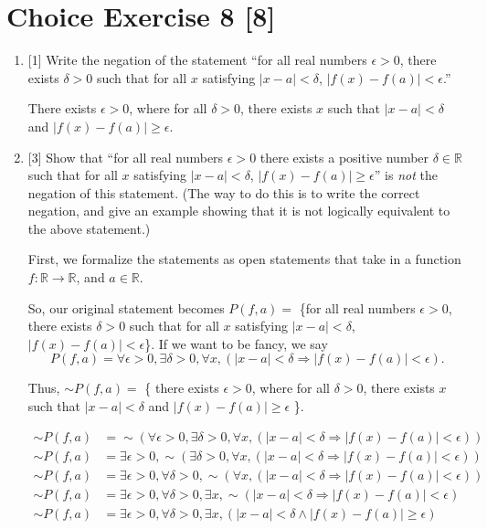 \documentclass{article}
\begin{document}
\section*{Choice Exercise 8 [8]}
\begin{enumerate}
    \item {
        [1] Write the negation of the statement ``for all real numbers \(\epsilon > 0\),
        there exists \(\delta > 0\) such that for all \(x\) satisfying \(|x - a| < \delta\),
        \(|f(x) - f(a)| < \epsilon\).''

        There exists \(\epsilon > 0\), where for all \(\delta > 0\), there exists 
        \(x\) such that \(|x - a| < \delta\) and \(|f(x) - f(a)| \ge \epsilon\).
    }

    \item {
        [3] Show that ``for all real numbers \(\epsilon > 0\) there exists a 
        positive number \(\delta \in \mathbb{R}\) such that for all \(x\) satisfying
        \(|x - a| < \delta\), \(|f(x) - f(a)| \ge \epsilon\)'' is \emph{not} the 
        negation of this statement.  (The way to do this is to write the correct 
        negation, and give an example showing that it is not logically equivalent 
        to the above statement.)

        First, we formalize the statements as open statements that take in a 
        function \(f: \mathbb{R} \rightarrow \mathbb{R}\), and \(a \in \mathbb{R}\).
        
        So, our original statement becomes \(P(f, a) = \) \{for all real numbers \(\epsilon > 0\),
        there exists \(\delta > 0\) such that for all \(x\) satisfying \(|x - a| < \delta\),
        \(|f(x) - f(a)| < \epsilon\)\}. If we want to be fancy, we say 
        \[P(f, a) = \forall \epsilon > 0, \exists \delta > 0, \forall x, (|x - a| < \delta \Rightarrow |f(x) - f(a)| < \epsilon).\]

        Thus, \(\sim P(f, a) = \) \{
            there exists \(\epsilon > 0\), where for all \(\delta > 0\), there exists 
            \(x\) such that \(|x - a| < \delta\) and \(|f(x) - f(a)| \ge \epsilon\)
        \}.

        \begin{align*}
            \sim P(f, a) &= \sim (\forall \epsilon > 0, \exists \delta > 0, \forall x, (|x - a| < \delta \Rightarrow |f(x) - f(a)| < \epsilon))\\
            \sim P(f, a) &= \exists \epsilon > 0, \sim (\exists \delta > 0, \forall x, (|x - a| < \delta \Rightarrow |f(x) - f(a)| < \epsilon))\\
            \sim P(f, a) &= \exists \epsilon > 0, \forall \delta > 0, \sim (\forall x, (|x - a| < \delta \Rightarrow |f(x) - f(a)| < \epsilon))\\
            \sim P(f, a) &= \exists \epsilon > 0, \forall \delta > 0, \exists x, \sim (|x - a| < \delta \Rightarrow |f(x) - f(a)| < \epsilon)\\
            \sim P(f, a) &= \exists \epsilon > 0, \forall \delta > 0, \exists x, (|x - a| < \delta \wedge |f(x) - f(a)| \ge \epsilon)\\
        \end{align*}
        

}
\end{enumerate}
\end{document}
